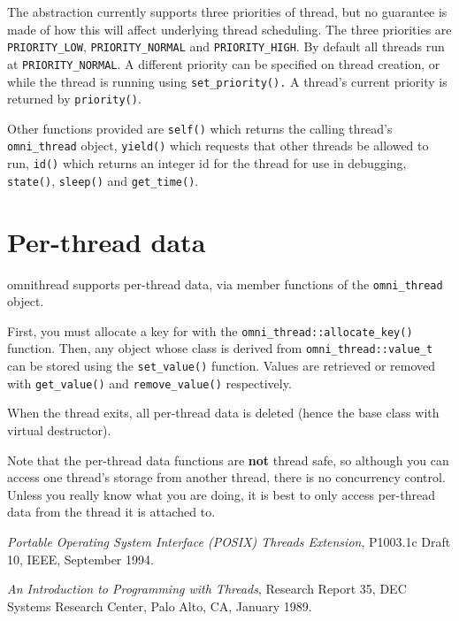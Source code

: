 \documentclass[11pt,oneside,a4paper]{article}
\newcommand{\dsc}{\discretionary{}{}}
\begin{document}
The abstraction currently supports three priorities of thread, but no
guarantee is made of how this will affect underlying thread
scheduling.  The three priorities are \texttt{PRIORITY\_LOW},
\texttt{PRIORITY\_NORMAL} and \texttt{PRIORITY\_HIGH}.  By default all
threads run at \texttt{PRIORITY\_NORMAL}.  A different priority can be
specified on thread creation, or while the thread is running using
\texttt{set\_priority().}  A thread's current priority is returned by
\texttt{priority()}.

Other functions provided are \texttt{self()} which returns the calling
thread's \texttt{omni\_\dsc{}thread} object, \texttt{yield()} which
requests that other threads be allowed to run, \texttt{id()} which
returns an integer id for the thread for use in debugging,
\texttt{state()}, \texttt{sleep()} and \texttt{get\_time()}.



\section{Per-thread data}

omnithread supports per-thread data, via member functions of the
\texttt{omni\_thread} object.

First, you must allocate a key for with the
\texttt{omni\_thread::allocate\_key()} function. Then, any object
whose class is derived from \texttt{omni\_thread::value\_t} can be
stored using the \texttt{set\_value()} function. Values are retrieved
or removed with \texttt{get\_value()} and \texttt{remove\_value()}
respectively.

When the thread exits, all per-thread data is deleted (hence the base
class with virtual destructor).

Note that the per-thread data functions are \textbf{not} thread safe,
so although you can access one thread's storage from another thread,
there is no concurrency control. Unless you really know what you are
doing, it is best to only access per-thread data from the thread it is
attached to.


\begin{thebibliography}{lo}

\emph{Portable Operating System Interface (POSIX) Threads Extension},
P1003.1c Draft 10,
IEEE,
September 1994.

\emph{An Introduction to Programming with Threads},
Research Report 35,
DEC Systems Research Center,
Palo Alto, CA,
January 1989.

\end{thebibliography}
\end{document}
